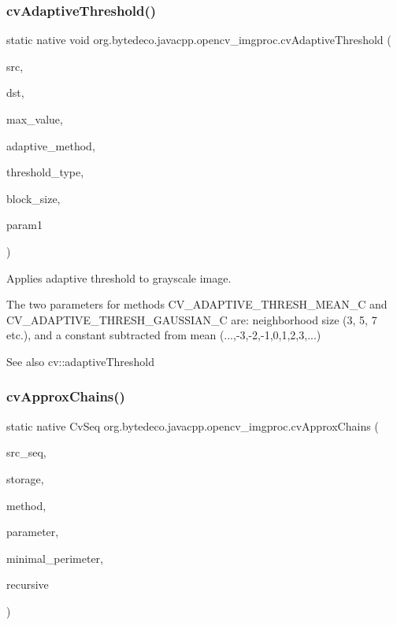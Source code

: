 \subsubsection{\texorpdfstring{cv\+Adaptive\+Threshold()}{cvAdaptiveThreshold()}}
{\footnotesize\ttfamily static native void org.\+bytedeco.\+javacpp.\+opencv\+\_\+imgproc.\+cv\+Adaptive\+Threshold (\begin{DoxyParamCaption}\item[{@Const Cv\+Arr}]{src,  }\item[{Cv\+Arr}]{dst,  }\item[{double}]{max\+\_\+value,  }\item[{int}]{adaptive\+\_\+method,  }\item[{int}]{threshold\+\_\+type,  }\item[{int}]{block\+\_\+size,  }\item[{double}]{param1 }\end{DoxyParamCaption})\hspace{0.3cm}{\ttfamily [static]}}



Applies adaptive threshold to grayscale image. 

The two parameters for methods C\+V\+\_\+\+A\+D\+A\+P\+T\+I\+V\+E\+\_\+\+T\+H\+R\+E\+S\+H\+\_\+\+M\+E\+A\+N\+\_\+C and C\+V\+\_\+\+A\+D\+A\+P\+T\+I\+V\+E\+\_\+\+T\+H\+R\+E\+S\+H\+\_\+\+G\+A\+U\+S\+S\+I\+A\+N\+\_\+C are\+: neighborhood size (3, 5, 7 etc.), and a constant subtracted from mean (...,-\/3,-\/2,-\/1,0,1,2,3,...) \begin{DoxySeeAlso}{See also}
cv\+::adaptive\+Threshold 
\end{DoxySeeAlso}
\mbox{\label{group__imgproc__c_ga5c874856009b84fc0c3a9533f957516c}} 
\subsubsection{\texorpdfstring{cv\+Approx\+Chains()}{cvApproxChains()}}
{\footnotesize\ttfamily static native Cv\+Seq org.\+bytedeco.\+javacpp.\+opencv\+\_\+imgproc.\+cv\+Approx\+Chains (\begin{DoxyParamCaption}\item[{Cv\+Seq}]{src\+\_\+seq,  }\item[{Cv\+Mem\+Storage}]{storage,  }\item[{int}]{method,  }\item[{double}]{parameter,  }\item[{int}]{minimal\+\_\+perimeter,  }\item[{int}]{recursive }\end{DoxyParamCaption})\hspace{0.3cm}{\ttfamily [static]}}



